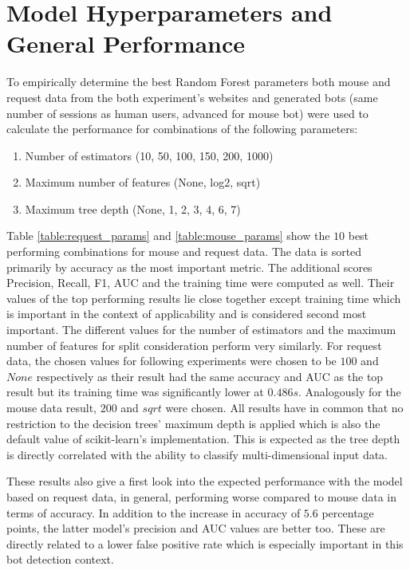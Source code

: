 \documentclass[
    fontsize=12pt,
    headings=small,
    parskip=half,           %
    bibliography=totoc,
    numbers=noenddot,       %
    open=any,               %
    final,                   %
    table
]{scrreprt}
\begin{document}
\section{Model Hyperparameters and General Performance}

To empirically determine the best Random Forest parameters both mouse and request data from the both experiment's websites and generated bots (same number of sessions as human users, advanced for mouse bot) were used to calculate the performance for combinations of the following parameters:

\begin{enumerate}
    \item Number of estimators (10, 50, 100, 150, 200, 1000)
    \item Maximum number of features (None, log2, sqrt)
    \item Maximum tree depth (None, 1, 2, 3, 4, 6, 7)
\end{enumerate}

Table \ref{table:request_params} and \ref{table:mouse_params} show the $10$ best performing combinations for mouse  and request data. The data is sorted primarily by accuracy as the most important metric. The additional scores Precision, Recall, F1, AUC and the training time were computed as well. Their values of the top performing results lie close together except training time which is important in the context of applicability and is considered second most important. The different values for the number of estimators and the maximum number of features for split consideration perform very similarly. For request data, the chosen values for following experiments were chosen to be $100$ and $None$ respectively as their result had the same accuracy and AUC as the top result but its training time was significantly lower at $0.486s$. Analogously for the mouse data result, $200$ and $sqrt$ were chosen. All results have in common that no restriction to the decision trees' maximum depth is applied which is also the default value of scikit-learn's implementation. This is expected as the tree depth is directly correlated with the ability to classify multi-dimensional input data.

These results also give a first look into the expected performance with the model based on request data, in general, performing worse compared to mouse data in terms of accuracy. In addition to the increase in accuracy of $5.6$ percentage points, the latter model's precision and AUC values are better too. These are directly related to a lower false positive rate which is especially important in this bot detection context.
\end{document}
